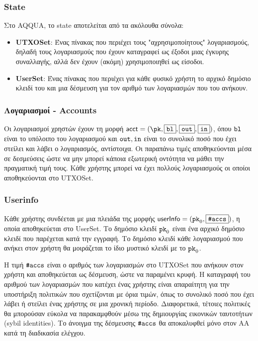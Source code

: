 \subsubsection{State}
Στο AQQUA, το state αποτελείται από τα ακόλουθα σύνολα:
\begin{itemize}
    \item \textbf{UTXOSet}: Ένας πίνακας που περιέχει τους "αχρησιμοποίητους" λογαριασμούς, δηλαδή τους λογαριασμούς που έχουν καταγραφεί ως έξοδοι μιας έγκυρης συναλλαγής, αλλά δεν έχουν (ακόμη) χρησιμοποιηθεί ως είσοδοι.
    \item \textbf{UserSet}: Ένας πίνακας που περιέχει για κάθε φυσικό χρήστη το αρχικό δημόσιο κλειδί του και μια δέσμευση για τον αριθμό των λογαριασμών που του ανήκουν.
\end{itemize}

\subsubsection{Λογαριασμοί - Accounts}
Οι λογαριασμοί χρηστών έχουν τη μορφή $\acct = (\pk, \comm{\varbl} , \comm{\varout} , \comm{\varin} )$, όπου $\textup{\texttt{{bl}}}$ είναι το υπόλοιπο του λογαριασμού και $\textup{\texttt{{out}}}, \textup{\texttt{{in}}}$ είναι το συνολικό ποσό που έχει στείλει και λάβει ο λογαριασμός, αντίστοιχα. Οι παραπάνω τιμές αποθηκεύονται μέσα σε δεσμεύσεις ώστε να μην μπορεί κάποια εξωτερική οντότητα να μάθει την πραγματική τιμή τους.
Κάθε χρήστης μπορεί να έχει πολλούς λογαριασμούς οι οποίοι αποθηκεύονται στο UTXOSet. 

\subsubsection{Userinfo}
Κάθε χρήστης συνδέεται με μια πλειάδα της μορφής $\textup{\textsf{userInfo}} = (\textup{\texttt{pk}}_{0}, \fbox{$\textup{\texttt{\#accs}}$})$, η οποία αποθηκεύεται στο UserSet. Το δημόσιο κλειδί $\textup{\texttt{pk}}_{0}$ είναι ένα αρχικό δημόσιο κλειδί που παρέχεται κατά την εγγραφή. Το δημόσιο κλειδί κάθε λογαριασμού που ανήκει στον χρήστη θα μοιράζεται το ίδιο μυστικό κλειδί με το $\textup{\texttt{pk}}_{0}$.

Η τιμή $\textup{\texttt{\#accs}}$ είναι ο αριθμός των λογαριασμών στο UTXOSet που ανήκουν στον χρήστη και αποθηκεύεται ως δέσμευση, ώστε να παραμένει κρυφή. Η καταγραφή του αριθμού των λογαριασμών που κατέχει ένας χρήστης είναι απαραίτητη για την υποστήριξη πολιτικών που σχετίζονται με όρια τιμών, όπως το συνολικό ποσό που έχει λάβει ή στείλει ένας χρήστης σε μια χρονική περίοδο. Διαφορετικά, τέτοιες πολιτικές θα μπορούσαν εύκολα να παρακαμφθούν μέσω της δημιουργίας εικονικών ταυτοτήτων (sybil identities). Το άνοιγμα της δέσμευσης $\textup{\texttt{\#accs}}$ θα αποκαλυφθεί μόνο στον ΑΑ κατά τη διαδικασία ελέγχου.

